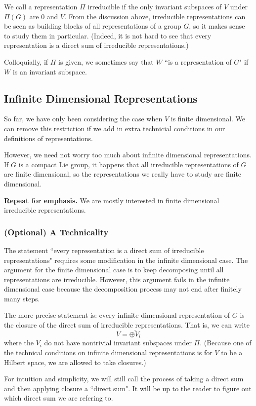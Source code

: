 We call a representation $\Pi$ irreducible if the only invariant subspaces of $V$ under $\Pi(G)$ are 0 and $V$. From the discussion above, irreducible representations can be seen as building blocks of all representations of a group $G$, so it makes sense to study them in particular. (Indeed, it is not hard to see that every representation is a direct sum of irreducible representations.)

Colloquially, if $\Pi$ is given, we sometimes say that $W$ ``is a representation of $G$" if $W$ is an invariant subspace.

\subsection{Infinite Dimensional Representations}
So far, we have only been considering the case when $V$ is finite dimensional. We can remove this restriction if we add in extra technicial conditions in our definitions of representations.

However, we need not worry too much about infinite dimensional representations. If $G$ is a compact Lie group, it happens that all irreducible representations of $G$ are finite dimensional, so the representations we really have to study are finite dimensional.

\textbf{Repeat for emphasis.} We are mostly interested in finite dimensional irreducible representations.

\subsubsection{(Optional) A Technicality}
The statement ``every representation is a direct sum of irreducible representations" requires some modification in the infinite dimensional case. The argument for the finite dimensional case is to keep decomposing until all representations are irreducible. However, this argument fails in the infinite dimensional case because the decomposition process may not end after finitely many steps.

The more precise statement is: every infinite dimensional representation of $G$ is the closure of the direct sum of irreducible representations. That is, we can write
\[
    V = \overline{\oplus V_i}
\]
where the $V_i$ do not have nontrivial invariant subspaces under $\Pi$. (Because one of the technical conditions on infinite dimensional representations is for $V$ to be a Hilbert space, we are allowed to take closures.)

For intuition and simplicity, we will still call the process of taking a direct sum and then applying closure a ``direct sum". It will be up to the reader to figure out which direct sum we are refering to.
